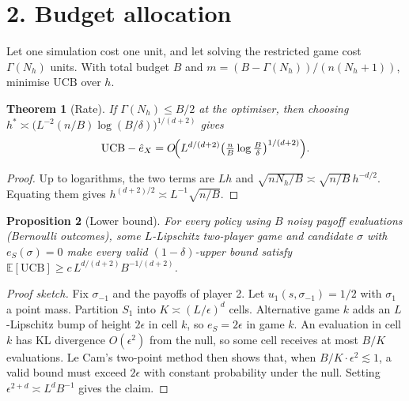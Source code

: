 \documentclass[11pt]{article}
\newtheorem{theorem}{Theorem}
\newtheorem{proposition}[theorem]{Proposition}
\theoremstyle{definition}
\begin{document}
\section*{2. Budget allocation}
Let one simulation cost one unit, and let solving the restricted game cost $\Gamma(N_h)$ units. With total budget $B$ and
$m=(B-\Gamma(N_h))/(n(N_h+1))$, minimise $\mathrm{UCB}$ over $h$.
\begin{theorem}[Rate]\label{thm:rate}
If $\Gamma(N_h)\le B/2$ at the optimiser, then choosing $h^*\asymp\bigl(L^{-2}(n/B)\log(B/\delta)\bigr)^{1/(d+2)}$ gives
\[
 \mathrm{UCB}-\hat e_X=O\!\Bigl(L^{d/(d+2)}\bigl(\tfrac nB\log\tfrac B\delta\bigr)^{1/(d+2)}\Bigr).
\]
\end{theorem}
\begin{proof}
Up to logarithms, the two terms are $Lh$ and $\sqrt{nN_h/B}\asymp\sqrt{n/B}\,h^{-d/2}$. Equating them gives
$h^{(d+2)/2}\asymp L^{-1}\sqrt{n/B}$.
\end{proof}
\begin{proposition}[Lower bound]\label{prop:lb}
For every policy using $B$ noisy payoff evaluations (Bernoulli outcomes), some $L$-Lipschitz two-player game and
candidate $\sigma$ with $e_S(\sigma)=0$ make every valid $(1-\delta)$-upper bound satisfy
$\mathbb E[\mathrm{UCB}]\ge c\,L^{d/(d+2)}B^{-1/(d+2)}$.
\end{proposition}
\begin{proof}[Proof sketch]
Fix $\sigma_{-1}$ and the payoffs of player 2. Let $u_1(s,\sigma_{-1})=1/2$ with $\sigma_1$ a point mass. Partition $S_1$
into $K\asymp(L/\epsilon)^d$ cells. Alternative game $k$ adds an $L$-Lipschitz bump of height $2\epsilon$ in cell $k$,
so $e_S=2\epsilon$ in game $k$. An evaluation in cell $k$ has KL divergence $O(\epsilon^2)$ from the null, so some
cell receives at most $B/K$ evaluations. Le Cam's two-point method then shows that, when $B/K\cdot\epsilon^2\lesssim1$, a
valid bound must exceed $2\epsilon$ with constant probability under the null. Setting
$\epsilon^{2+d}\asymp L^dB^{-1}$ gives the claim.
\end{proof}
\end{document}
